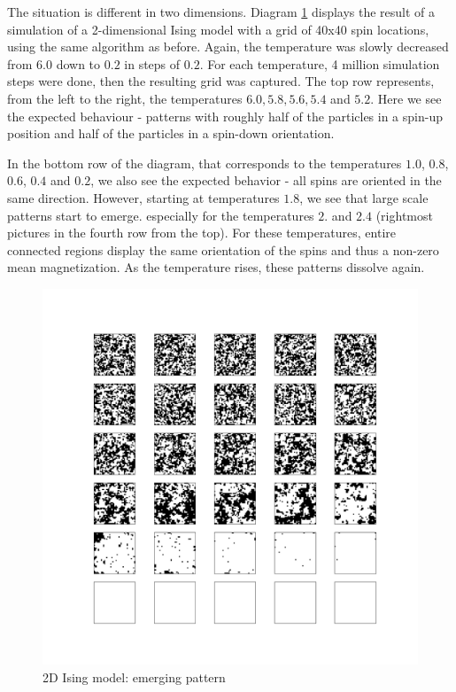 \documentclass[a4paper, draft]{article}
\theoremstyle{own}
\theoremstyle{remark}
\begin{document}
The situation is different in two dimensions. Diagram \ref{fig:Ising2DPattern} displays the result of a simulation of a 2-dimensional Ising model with a grid of 40x40 spin locations, using the same algorithm as before. Again, the temperature was slowly decreased from $6.0$ down to $0.2$ in steps of $0.2$. For each temperature, 4 million simulation steps were done, then the resulting grid was captured. The top row represents, from the left to the right, the temperatures $6.0, 5.8, 5.6, 5.4$ and $5.2$. Here we see the expected behaviour - patterns with roughly half of the particles in a spin-up position and half of the particles in a spin-down orientation. 

In the bottom row of the diagram, that corresponds to the temperatures $1.0$, $0.8$, $0.6$, $0.4$ and $0.2$, we also see the expected behavior - all spins are oriented in the same direction. However, starting at temperatures $1.8$, we see that large scale patterns start to emerge. especially for the temperatures $2.$ and $2.4$ (rightmost pictures in the fourth row from the top). For these temperatures, entire connected regions display the same orientation of the spins and thus a non-zero mean magnetization. As the temperature rises, these patterns dissolve again.



\begin{figure}[ht]
\centering
\includegraphics[width=1.0\linewidth]{Ising2DPattern}
\caption{2D Ising model: emerging pattern}
\label{fig:Ising2DPattern}
\end{figure}
\end{document}
